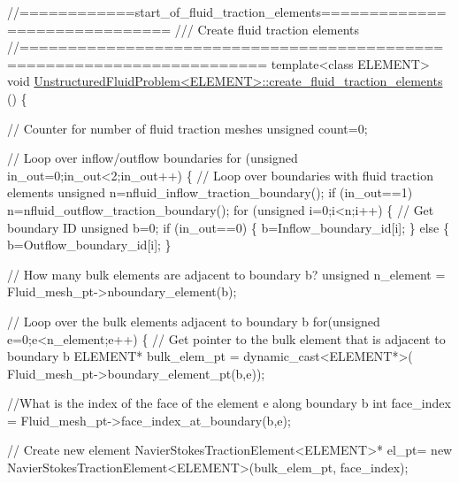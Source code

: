 \begin{DoxyCodeInclude}
\textcolor{comment}{//============start\_of\_fluid\_traction\_elements==============================}
\textcolor{comment}{/// Create fluid traction elements }
\textcolor{comment}{}\textcolor{comment}{//=======================================================================}
\textcolor{keyword}{template}<\textcolor{keyword}{class} ELEMENT>
\textcolor{keywordtype}{void} \hyperlink{classUnstructuredFluidProblem_ae95f1912572e8a5f0543eab9c0eb2634}{UnstructuredFluidProblem<ELEMENT>::create\_fluid\_traction\_elements}
      ()
\{

 \textcolor{comment}{// Counter for number of fluid traction meshes}
 \textcolor{keywordtype}{unsigned} count=0;

 \textcolor{comment}{// Loop over inflow/outflow boundaries}
 \textcolor{keywordflow}{for} (\textcolor{keywordtype}{unsigned} in\_out=0;in\_out<2;in\_out++)
  \{
   \textcolor{comment}{// Loop over boundaries with fluid traction elements}
   \textcolor{keywordtype}{unsigned} n=nfluid\_inflow\_traction\_boundary();
   \textcolor{keywordflow}{if} (in\_out==1) n=nfluid\_outflow\_traction\_boundary();
   \textcolor{keywordflow}{for} (\textcolor{keywordtype}{unsigned} i=0;i<n;i++)
    \{
     \textcolor{comment}{// Get boundary ID}
     \textcolor{keywordtype}{unsigned} b=0;
     \textcolor{keywordflow}{if} (in\_out==0)
      \{
       b=Inflow\_boundary\_id[i];
      \}
     \textcolor{keywordflow}{else}
      \{
       b=Outflow\_boundary\_id[i];
      \}
     
     \textcolor{comment}{// How many bulk elements are adjacent to boundary b?}
     \textcolor{keywordtype}{unsigned} n\_element = Fluid\_mesh\_pt->nboundary\_element(b);
     
     \textcolor{comment}{// Loop over the bulk elements adjacent to boundary b}
     \textcolor{keywordflow}{for}(\textcolor{keywordtype}{unsigned} e=0;e<n\_element;e++)
      \{
       \textcolor{comment}{// Get pointer to the bulk element that is adjacent to boundary b}
       ELEMENT* bulk\_elem\_pt = \textcolor{keyword}{dynamic\_cast<}ELEMENT*\textcolor{keyword}{>}(
        Fluid\_mesh\_pt->boundary\_element\_pt(b,e));
       
       \textcolor{comment}{//What is the index of the face of the element e along boundary b}
       \textcolor{keywordtype}{int} face\_index = Fluid\_mesh\_pt->face\_index\_at\_boundary(b,e);
       
       \textcolor{comment}{// Create new element }
       NavierStokesTractionElement<ELEMENT>* el\_pt=
        \textcolor{keyword}{new} NavierStokesTractionElement<ELEMENT>(bulk\_elem\_pt,
                                                       face\_index);
       

\end{DoxyCodeInclude}
